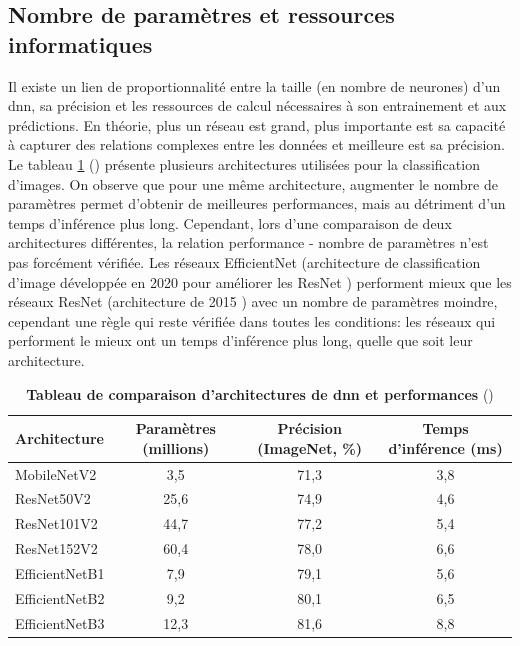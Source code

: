 \subsection{Nombre de paramètres et ressources informatiques}
Il existe un lien de proportionnalité entre la taille (en nombre de neurones) d'un \gls{dnn}, sa précision et les ressources de calcul nécessaires à son entrainement et aux prédictions. En théorie, plus un réseau est grand, plus importante est sa capacité à capturer des relations complexes entre les données et meilleure est sa précision. Le tableau \ref{table:dnn-size} (\cite{chollet_keras_2023}) présente plusieurs architectures utilisées pour la classification d'images. On observe que pour une même architecture, augmenter le nombre de paramètres permet d'obtenir de meilleures performances, mais au détriment d'un temps d'inférence plus long. Cependant, lors d'une comparaison de deux architectures différentes, la relation performance - nombre de paramètres n'est pas forcément vérifiée. Les réseaux EfficientNet (architecture de classification d'image développée en 2020  pour améliorer les ResNet \cite{tan_efficientnet_2020}) performent mieux que les réseaux ResNet (architecture de 2015 \cite{he_deep_2015}) avec un nombre de paramètres moindre, cependant une règle qui reste vérifiée dans toutes les conditions: les réseaux qui performent le mieux ont un temps d'inférence plus long, quelle que soit leur architecture.

\begin{table}[!ht]
\centering
\begin{tabular}{|l|c|c|c|} 
 \hline
 Architecture & Paramètres (millions) & Précision (ImageNet, \%)  & Temps d'inférence (ms) \\
 \hline
MobileNetV2 & 3,5 & 71,3 & 3,8 \\
\hline
ResNet50V2 & 25,6 & 74,9 & 4,6 \\ 
ResNet101V2 & 44,7 & 77,2 & 5,4 \\ 
ResNet152V2 & 60,4 & 78,0 & 6,6 \\
\hline
EfficientNetB1 & 7,9 & 79,1 & 5,6 \\
EfficientNetB2 & 9,2 & 80,1& 6,5 \\
EfficientNetB3 & 12,3 & 81,6 & 8,8 \\
 \hline
\end{tabular}
\caption[Tableau de comparaison d'architectures de \gls{dnn} et performances]{\textbf{Tableau de comparaison d'architectures de \gls{dnn} et performances} (\cite{chollet_keras_2023})}
\label{table:dnn-size}
\end{table}

